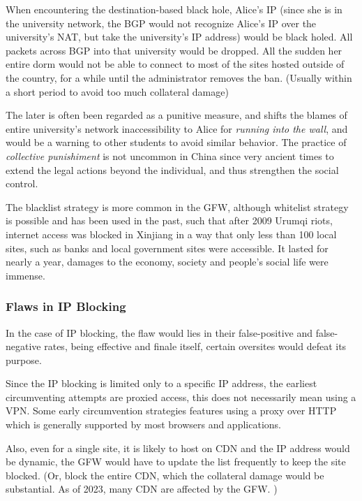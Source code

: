 When encountering the destination-based black hole, Alice's IP (since
she is in the university network, the BGP would not recognize Alice's IP
over the university's NAT, but take the university's IP address) would
be black holed. All packets across BGP into that university would be
dropped. All the sudden her entire dorm would not be able to connect to
most of the sites hosted outside of the country, for a while until the
administrator removes the ban. (Usually within a short period to avoid
too much collateral damage)

The later is often been regarded as a punitive measure, and shifts the
blames of entire university's network inaccessibility to Alice for
\emph{running into the wall}, and would be a warning to other students
to avoid similar behavior. The practice of \emph{collective punishiment}
is not uncommon in China since very ancient times to extend the legal
actions beyond the individual, and thus strengthen the social control.
\cite{17_earlyChina}

The blacklist strategy is more common in the GFW, although whitelist
strategy is possible and has been used in the past, such that after 2009
Urumqi riots, internet access was blocked in Xinjiang in a way that only
less than 100 local sites, such as banks and local government sites were
accessible. \cite{10_missingLink} It lasted for nearly a year,
\cite{11_xinjiang} damages to the economy, society and people's social
life were immense.

\hypertarget{flaws-in-ip-blocking}{%
\subsubsection{Flaws in IP Blocking}\label{flaws-in-ip-blocking}}

In the case of IP blocking, the flaw would lies in their false-positive
and false-negative rates, being effective and finale itself, certain
oversites would defeat its purpose.

Since the IP blocking is limited only to a specific IP address, the
earliest circumventing attempts are proxied access, this does not
necessarily mean using a VPN. Some early circumvention strategies
features using a proxy over HTTP which is generally supported by most
browsers and applications. \cite{18_GFWSpaceTime}

Also, even for a single site, it is likely to host on CDN and the IP
address would be dynamic, the GFW would have to update the list
frequently to keep the site blocked. (Or, block the entire CDN, which
the collateral damage would be substantial. As of 2023, many CDN are
affected by the GFW. \cite{19_detect})

